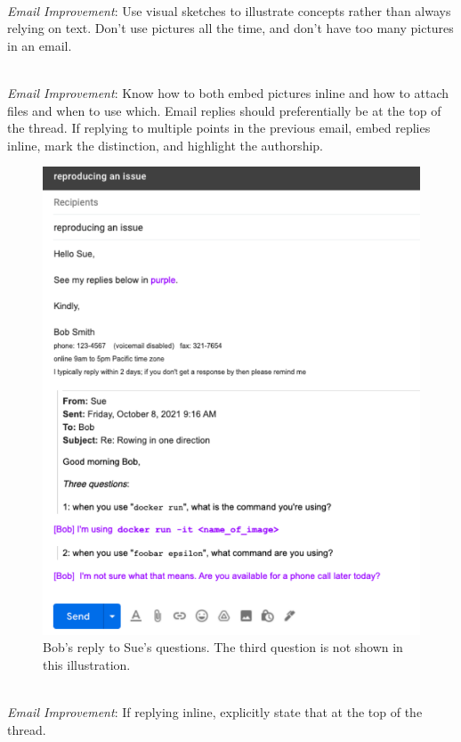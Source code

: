 \ \\
\textit{Email Improvement}: Use visual sketches to illustrate concepts rather than always relying on text. Don't use pictures all the time, and don't have too many pictures in an email. 

\ \\
\textit{Email Improvement}: Know how to both embed pictures inline and how to attach files and when to use which. 
Email replies should preferentially be at the top of the thread. 
If replying to multiple points in the previous email, embed replies inline, mark the distinction, and highlight the authorship. 

\begin{figure}
\includegraphics[width=1\textwidth]{images/email_reply.pdf}
\caption{Bob's reply to Sue's questions. The third question is not shown in this illustration.}
\label{fig:email_reply}
\end{figure}

\ \\
\textit{Email Improvement}: If replying inline, explicitly state that at the top of the thread.

